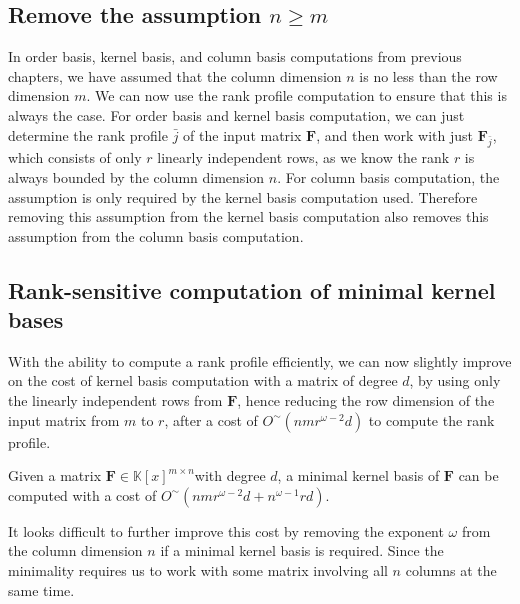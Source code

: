 \subsection{\label{sub:removeDimensionAssumption}Remove the assumption $n\ge m$}

In order basis, kernel basis, and column basis computations from previous
chapters, we have assumed that the column dimension $n$ is no less
than the row dimension $m.$ We can now use the rank profile computation
to ensure that this is always the case. For order basis and kernel
basis computation, we can just determine the rank profile $\bar{j}$
of the input matrix $\mathbf{F}$, and then work with just $\mathbf{F}_{\bar{j}}$,
which consists of only $r$ linearly independent rows, as we know
the rank $r$ is always bounded by the column dimension $n$. For
column basis computation, the assumption is only required by the kernel
basis computation used. Therefore removing this assumption from the
kernel basis computation also removes this assumption from the column
basis computation.


\subsection{Rank-sensitive computation of minimal kernel bases}

With the ability to compute a rank profile efficiently, we can now
slightly improve  on the
cost of kernel basis computation with a matrix of degree $d$, by
using only the linearly independent rows from $\mathbf{F}$, hence
reducing the row dimension of the input matrix from $m$ to $r$,
after a cost of $O^{\sim}\left(nmr^{\omega-2}d\right)$ to compute
the rank profile. 
\begin{thm}
Given a matrix $\mathbf{F}\in\mathbb{K}\left[x\right]^{m\times n}$with
degree $d$, a minimal kernel basis of $\mathbf{F}$ can be computed
with a cost of $O^{\sim}(nmr^{\omega-2}d+n^{\omega-1}rd)$.
\end{thm}
It looks difficult to further improve this cost by removing the exponent
$\omega$ from the column dimension $n$ if a minimal kernel basis
is required. Since the minimality requires us to work with some matrix
involving all $n$ columns at the same time. 
